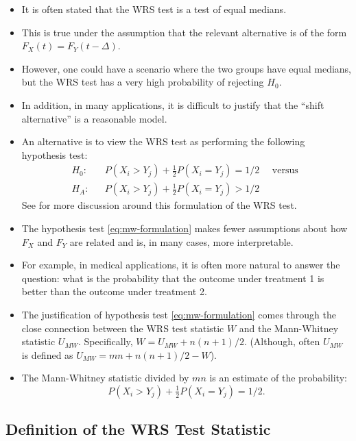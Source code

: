 \documentclass[]{book}
\begin{document}
\begin{itemize}
\item
  It is often stated that the WRS test is a test
  of equal medians.
\item
  This is true under the assumption that the
  relevant alternative is of the form \(F_{X}(t) = F_{Y}(t - \Delta)\).
\item
  However, one could have a scenario where the two groups have equal medians, but
  the WRS test has a very high probability of rejecting \(H_{0}\).
\item
  In addition, in many applications, it is difficult to justify
  that the ``shift alternative'' is a reasonable model.
\item
  An alternative is to view the WRS test as performing the following
  hypothesis test:
  \begin{eqnarray}
  H_{0}: && P(X_{i} > Y_{j}) + \tfrac{1}{2}P(X_{i} = Y_{j}) = 1/2 \quad \textrm{ versus } \\
  H_{A}: && P(X_{i} > Y_{j}) + \tfrac{1}{2}P(X_{i} = Y_{j}) > 1/2
  \label{eq:mw-formulation}
  \end{eqnarray}
  See \citet{divine2018} for more discussion around this formulation of the
  WRS test.
\item
  The hypothesis test \eqref{eq:mw-formulation} makes fewer assumptions
  about how \(F_{X}\) and \(F_{Y}\) are related and is, in many cases, more interpretable.
\item
  For example, in medical applications, it is often more natural to
  answer the question: what is the probability that the outcome
  under treatment 1 is better than the outcome under treatment 2.
\item
  The justification of hypothesis test \eqref{eq:mw-formulation} comes through
  the close connection between the WRS test statistic \(W\) and the Mann-Whitney statistic \(U_{MW}\).
  Specifically, \(W = U_{MW} + n(n+1)/2\). (Although, often \(U_{MW}\) is defined as
  \(U_{MW} = mn + n(n+1)/2 - W\)).
\item
  The Mann-Whitney statistic divided by \(mn\) is an estimate of the probability:
  \begin{equation}
  P(X_{i} > Y_{j}) + \tfrac{1}{2}P(X_{i} = Y_{j}) = 1/2.
  \end{equation}
\end{itemize}

\hypertarget{definition-of-the-wrs-test-statistic}{%
\subsection{Definition of the WRS Test Statistic}\label{definition-of-the-wrs-test-statistic}}
\end{document}
